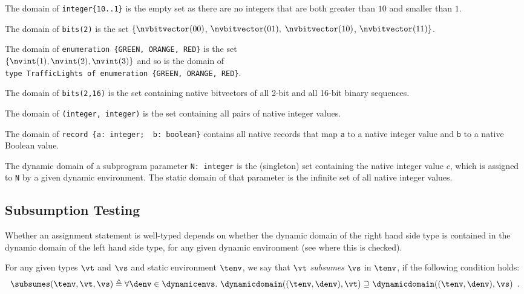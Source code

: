 The domain of \verb|integer{10..1}| is the empty set as there are no integers that are
both greater than $10$ and smaller than $1$.

The domain of \texttt{bits(2)} is the set $\{\nvbitvector(00)$, $\nvbitvector(01),$
$\nvbitvector(10)$, $\nvbitvector(11)\}$.

The domain of \verb|enumeration {GREEN, ORANGE, RED}| is the set \\
$\{\nvint(1), \nvint(2), \nvint(3)\}$ and so is the domain
of \\
\verb|type TrafficLights of enumeration {GREEN, ORANGE, RED}|.

The domain of \texttt{bits({2,16})} is the set containing native bitvectors of all 2-bit and all 16-bit binary sequences.

The domain of \texttt{(integer, integer)} is the set containing all pairs of native integer values.

The domain of \verb|record {a: integer;  b: boolean}| contains all native records
that map \texttt{a} to a native integer value and \texttt{b} to a native Boolean value.

The dynamic domain of a subprogram parameter \texttt{N: integer} is the (singleton) set containing
the native integer value $c$,
which is assigned to \texttt{N} by a given dynamic environment. The static domain of that parameter
is the infinite set of all native integer values.


\subsection{Subsumption Testing\label{sec:subsumptiontesting}}
Whether an assignment statement is well-typed depends on whether the dynamic domain of the
right hand side type is contained in the dynamic domain of the left hand side type,
for any given dynamic environment
(see  where this is checked).

\begin{definition}[Subsumption]
For any given types $\vt$ and $\vs$ and static environment $\tenv$,
we say that $\vt$ \emph{subsumes} $\vs$ in $\tenv$,
if the following condition holds:
\hypertarget{def-subsumes}{}
\begin{equation}
  \subsumes(\tenv, \vt, \vs) \triangleq \forall \denv\in\dynamicenvs.\ \dynamicdomain((\tenv, \denv), \vt) \supseteq \dynamicdomain((\tenv, \denv), \vs) \enspace.
\end{equation}
\end{definition}

